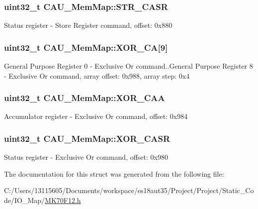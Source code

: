\subsubsection[{S\+T\+R\+\_\+\+C\+A\+S\+R}]{\setlength{\rightskip}{0pt plus 5cm}uint32\+\_\+t C\+A\+U\+\_\+\+Mem\+Map\+::\+S\+T\+R\+\_\+\+C\+A\+S\+R}\label{struct_c_a_u___mem_map_ad90eef15bc61290af107c3d5871599a8}
Status register -\/ Store Register command, offset\+: 0x880 \hypertarget{struct_c_a_u___mem_map_acb520a0239533ff35af926264fd9a6a9}{}
\subsubsection[{X\+O\+R\+\_\+\+C\+A}]{\setlength{\rightskip}{0pt plus 5cm}uint32\+\_\+t C\+A\+U\+\_\+\+Mem\+Map\+::\+X\+O\+R\+\_\+\+C\+A\mbox{[}9\mbox{]}}\label{struct_c_a_u___mem_map_acb520a0239533ff35af926264fd9a6a9}
General Purpose Register 0 -\/ Exclusive Or command..General Purpose Register 8 -\/ Exclusive Or command, array offset\+: 0x988, array step\+: 0x4 \hypertarget{struct_c_a_u___mem_map_a5597e40ecdc9aaf07f342eea55467ff1}{}
\subsubsection[{X\+O\+R\+\_\+\+C\+A\+A}]{\setlength{\rightskip}{0pt plus 5cm}uint32\+\_\+t C\+A\+U\+\_\+\+Mem\+Map\+::\+X\+O\+R\+\_\+\+C\+A\+A}\label{struct_c_a_u___mem_map_a5597e40ecdc9aaf07f342eea55467ff1}
Accumulator register -\/ Exclusive Or command, offset\+: 0x984 \hypertarget{struct_c_a_u___mem_map_a9a390a748c987c883432ae79087640e2}{}
\subsubsection[{X\+O\+R\+\_\+\+C\+A\+S\+R}]{\setlength{\rightskip}{0pt plus 5cm}uint32\+\_\+t C\+A\+U\+\_\+\+Mem\+Map\+::\+X\+O\+R\+\_\+\+C\+A\+S\+R}\label{struct_c_a_u___mem_map_a9a390a748c987c883432ae79087640e2}
Status register -\/ Exclusive Or command, offset\+: 0x980 

The documentation for this struct was generated from the following file\+:\begin{DoxyCompactItemize}
\item 
C\+:/\+Users/13115605/\+Documents/workspace/es18aut35/\+Project/\+Project/\+Static\+\_\+\+Code/\+I\+O\+\_\+\+Map/\hyperlink{_m_k70_f12_8h}{M\+K70\+F12.\+h}\end{DoxyCompactItemize}
